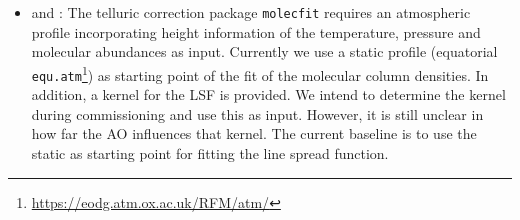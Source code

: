 \begin{itemize}
    \item {} and : The telluric correction package \texttt{molecfit} requires an atmospheric profile incorporating height information of the temperature, pressure and molecular abundances as input. Currently we use a static profile (equatorial \texttt{equ.atm}\footnote{\url{https://eodg.atm.ox.ac.uk/RFM/atm/}}) as starting point of the fit of the molecular column densities. In addition, a kernel for the \ac{LSF} is provided. We intend to determine the kernel during commissioning and use this as input. However, it is still unclear in how far the \ac{AO} influences that kernel. The current baseline is to use the static  as starting point for fitting the line spread function.
\end{itemize}